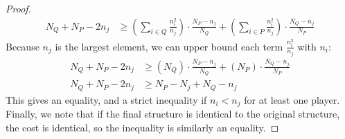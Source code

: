 \documentclass{article}
\newcommand{\p}[1]{\left( #1 \right)}
\newcommand{\cd}[0]{\cdot}
\newcommand{\ndraw}[0]{\ensuremath{n}}
\newcommand{\total}[0]{\ensuremath{N}}
\begin{document}
\begin{proof}
\begin{align*}
 \total_Q + \total_P - 2\ndraw_j &\geq  \p{\sum_{i \in Q} \frac{\ndraw_i^2}{\ndraw_j}} \cd \frac{\total_P - \ndraw_j}{\total_Q} + \p{\sum_{i \in P} \frac{\ndraw_i^2}{\ndraw_j}} \cd \frac{\total_Q - \ndraw_j}{\total_P}
\end{align*}
Because $\ndraw_j$ is the largest element, we can upper bound each term $\frac{\ndraw_i^2}{\ndraw_j}$ with $\ndraw_i$:
\begin{align*}
\total_Q + \total_P - 2\ndraw_j &\geq  \p{\total_Q} \cd \frac{\total_P - \ndraw_j}{\total_Q} + \p{\total_P} \cd \frac{\total_Q - \ndraw_j}{\total_P}  \\
\total_Q + \total_P - 2\ndraw_j &\geq \total_P - \total_j + \total_Q - \ndraw_j
\end{align*}
This gives an equality, and a strict inequality if $\ndraw_i < \ndraw_j$ for at least one player. Finally, we note that if the final structure is identical to the original structure, the cost is identical, so the inequality is similarly an equality.
\end{proof}
\end{document}
